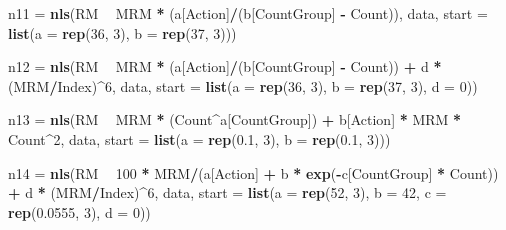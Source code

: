 \documentclass[
]{article}
\newenvironment{Shaded}{\begin{snugshade}}{\end{snugshade}}
\newcommand{\DataTypeTok}[1]{\textcolor[rgb]{0.13,0.29,0.53}{#1}}
\newcommand{\DecValTok}[1]{\textcolor[rgb]{0.00,0.00,0.81}{#1}}
\newcommand{\FloatTok}[1]{\textcolor[rgb]{0.00,0.00,0.81}{#1}}
\newcommand{\KeywordTok}[1]{\textcolor[rgb]{0.13,0.29,0.53}{\textbf{#1}}}
\newcommand{\NormalTok}[1]{#1}
\newcommand{\OperatorTok}[1]{\textcolor[rgb]{0.81,0.36,0.00}{\textbf{#1}}}
\newcommand{\StringTok}[1]{\textcolor[rgb]{0.31,0.60,0.02}{#1}}
\begin{document}
\begin{Shaded}
\begin{Highlighting}[]
\NormalTok{n11 =}\StringTok{ }\KeywordTok{nls}\NormalTok{(RM }\OperatorTok{~}\StringTok{ }\NormalTok{MRM }\OperatorTok{*}\StringTok{ }\NormalTok{(a[Action]}\OperatorTok{/}\NormalTok{(b[CountGroup] }\OperatorTok{-}\StringTok{ }\NormalTok{Count)), data, }\DataTypeTok{start =} \KeywordTok{list}\NormalTok{(}\DataTypeTok{a =} \KeywordTok{rep}\NormalTok{(}\DecValTok{36}\NormalTok{, }
    \DecValTok{3}\NormalTok{), }\DataTypeTok{b =} \KeywordTok{rep}\NormalTok{(}\DecValTok{37}\NormalTok{, }\DecValTok{3}\NormalTok{)))}

\NormalTok{n12 =}\StringTok{ }\KeywordTok{nls}\NormalTok{(RM }\OperatorTok{~}\StringTok{ }\NormalTok{MRM }\OperatorTok{*}\StringTok{ }\NormalTok{(a[Action]}\OperatorTok{/}\NormalTok{(b[CountGroup] }\OperatorTok{-}\StringTok{ }\NormalTok{Count)) }\OperatorTok{+}\StringTok{ }\NormalTok{d }\OperatorTok{*}\StringTok{ }\NormalTok{(MRM}\OperatorTok{/}\NormalTok{Index)}\OperatorTok{^}\DecValTok{6}\NormalTok{, data, }
    \DataTypeTok{start =} \KeywordTok{list}\NormalTok{(}\DataTypeTok{a =} \KeywordTok{rep}\NormalTok{(}\DecValTok{36}\NormalTok{, }\DecValTok{3}\NormalTok{), }\DataTypeTok{b =} \KeywordTok{rep}\NormalTok{(}\DecValTok{37}\NormalTok{, }\DecValTok{3}\NormalTok{), }\DataTypeTok{d =} \DecValTok{0}\NormalTok{))}


\NormalTok{n13 =}\StringTok{ }\KeywordTok{nls}\NormalTok{(RM }\OperatorTok{~}\StringTok{ }\NormalTok{MRM }\OperatorTok{*}\StringTok{ }\NormalTok{(Count}\OperatorTok{^}\NormalTok{a[CountGroup]) }\OperatorTok{+}\StringTok{ }\NormalTok{b[Action] }\OperatorTok{*}\StringTok{ }\NormalTok{MRM }\OperatorTok{*}\StringTok{ }\NormalTok{Count}\OperatorTok{^}\DecValTok{2}\NormalTok{, data, }\DataTypeTok{start =} \KeywordTok{list}\NormalTok{(}\DataTypeTok{a =} \KeywordTok{rep}\NormalTok{(}\FloatTok{0.1}\NormalTok{, }
    \DecValTok{3}\NormalTok{), }\DataTypeTok{b =} \KeywordTok{rep}\NormalTok{(}\FloatTok{0.1}\NormalTok{, }\DecValTok{3}\NormalTok{)))}

\NormalTok{n14 =}\StringTok{ }\KeywordTok{nls}\NormalTok{(RM }\OperatorTok{~}\StringTok{ }\DecValTok{100} \OperatorTok{*}\StringTok{ }\NormalTok{MRM}\OperatorTok{/}\NormalTok{(a[Action] }\OperatorTok{+}\StringTok{ }\NormalTok{b }\OperatorTok{*}\StringTok{ }\KeywordTok{exp}\NormalTok{(}\OperatorTok{-}\NormalTok{c[CountGroup] }\OperatorTok{*}\StringTok{ }\NormalTok{Count)) }\OperatorTok{+}\StringTok{ }\NormalTok{d }\OperatorTok{*}\StringTok{ }\NormalTok{(MRM}\OperatorTok{/}\NormalTok{Index)}\OperatorTok{^}\DecValTok{6}\NormalTok{, }
\NormalTok{    data, }\DataTypeTok{start =} \KeywordTok{list}\NormalTok{(}\DataTypeTok{a =} \KeywordTok{rep}\NormalTok{(}\DecValTok{52}\NormalTok{, }\DecValTok{3}\NormalTok{), }\DataTypeTok{b =} \DecValTok{42}\NormalTok{, }\DataTypeTok{c =} \KeywordTok{rep}\NormalTok{(}\FloatTok{0.0555}\NormalTok{, }\DecValTok{3}\NormalTok{), }\DataTypeTok{d =} \DecValTok{0}\NormalTok{))}
\end{Highlighting}
\end{Shaded}
\end{document}
